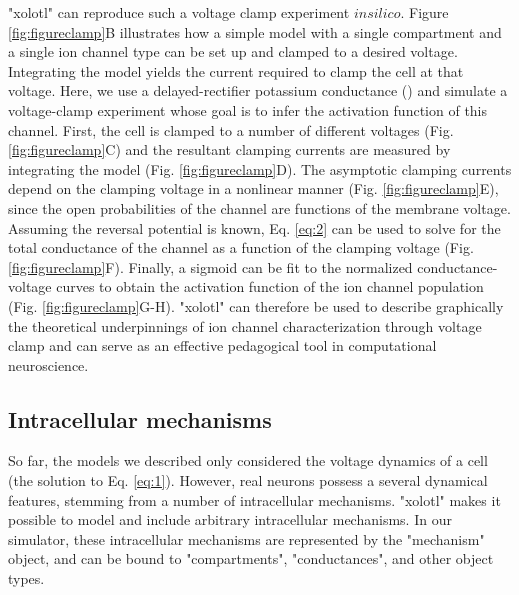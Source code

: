 \documentclass{frontiersSCNS} %
\begin{document}
"xolotl" can reproduce such a voltage clamp experiment $in silico$. Figure \ref{fig:figureclamp}B illustrates how a simple model with a single compartment and a single ion channel type can be set up and clamped to a desired voltage.  Integrating the model yields the current required to clamp the cell at that voltage. Here, we use a delayed-rectifier potassium conductance (\cite{liuModelNeuronActivityDependent1998}) and simulate a voltage-clamp experiment whose goal is to infer the activation function of this channel. First, the cell is clamped to a number of different voltages (Fig. \ref{fig:figureclamp}C) and the resultant clamping currents are measured by integrating the model (Fig. \ref{fig:figureclamp}D). The asymptotic clamping currents depend on the clamping voltage in a nonlinear manner (Fig. \ref{fig:figureclamp}E), since the open probabilities of the channel are functions of the membrane voltage. Assuming the reversal potential is known, Eq. \eqref{eq:2} can be used to solve for the total conductance of the channel as a function of the clamping voltage (Fig. \ref{fig:figureclamp}F). Finally, a sigmoid can be fit to the normalized conductance-voltage curves to obtain the activation function of the ion channel population (Fig. \ref{fig:figureclamp}G-H). "xolotl" can therefore be used to describe graphically the theoretical underpinnings of ion channel characterization through voltage clamp and can serve as an effective pedagogical tool in computational neuroscience.

%
%
%
%
%
%



\subsection{Intracellular mechanisms}

So far, the models we described only considered the voltage dynamics of a cell (the solution to Eq. \ref{eq:1}). However, real neurons possess a several dynamical features, stemming from a number of intracellular mechanisms. "xolotl" makes it possible to model and include arbitrary intracellular mechanisms. In our simulator, these intracellular mechanisms are represented by the "mechanism" object, and can be bound to "compartments", "conductances", and other object types.
\end{document}
